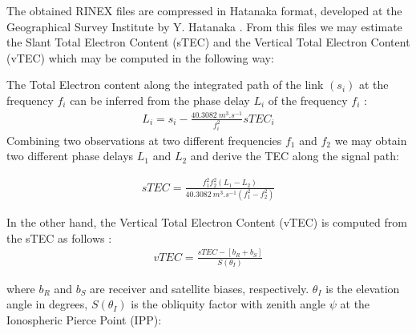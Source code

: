 %      
%      
%      

  The obtained RINEX files are compressed in Hatanaka format, developed at the Geographical Survey Institute by Y. Hatanaka \citep{Kumar:2012}. From this files we may estimate the Slant Total Electron Content (sTEC) and the Vertical Total Electron Content (vTEC) which may be computed in the following way:

  The Total Electron content along the integrated path of the link $(s_i)$ at the frequency $f_i$ can be inferred from the phase delay $L_i$ of the frequency $f_i$ \citep{Emery:2017}:
  \begin{align}
    L_i = s_i - \frac{\SI{40.3082}{m^3.s^{-1}}}{f_i^2}sTEC_i
  \end{align}
  Combining two observations at two different frequencies $f_1$ and $f_2$ we may obtain two different phase delays $L_1$ and $L_2$ and derive the TEC along the signal path:

  \begin{align}
    sTEC = \frac{f_1^2f_2^2\left(L_1-L_2\right)}{\SI{40.3082}{m^3.s^{-1}}\left(f_1^2-f_2^2\right)}
  \end{align}

  In the other hand, the Vertical Total Electron Content (vTEC) is computed from the sTEC as follows \citep{Kumar:2012}:
  \begin{align}
    vTEC = \frac{sTEC-\left[b_R+b_S\right]}{S(\theta_I)}
  \end{align}

  where $b_R$ and $b_S$ are receiver and satellite biases, respectively. $\theta_I$ is the elevation angle in degrees, $S(\theta_I)$ is the obliquity factor with zenith angle $\psi$ at the Ionospheric Pierce Point (IPP):

